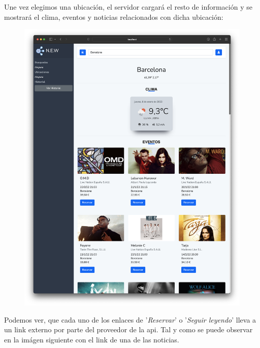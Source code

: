 \documentclass[../ei103948-project-documentation.tex]{subfiles}
\begin{document}
                                Une vez elegimos una ubicación, el servidor cargará el resto de información y se mostrará el clima, eventos y noticias relacionados con dicha ubicación:


                                \begin{figure}[H]
                                    \begin{center}
                                        \hspace*{-9mm}
                                    \includegraphics[scale=0.37]{images/final4.png}
                                    \end{center}
                                \end{figure}

                                \newpage

                                Podemos ver, que cada uno de los enlaces de '\textit{Reservar}' o '\textit{Seguir leyendo}' lleva a un link externo por parte del proveedor de la api. Tal y como se puede observar en la imágen siguiente con el link de una de las noticias.
\end{document}
